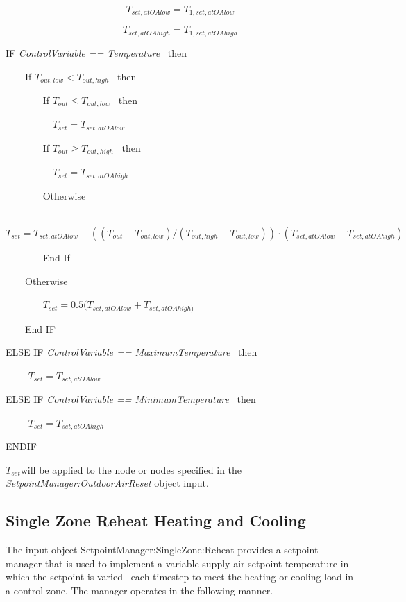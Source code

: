 \begin{equation}
{T_{set,atOAlow}} = {T_{1,set,atOAlow}}
\end{equation}

\begin{equation}
{T_{set,atOAhigh}} = {T_{1,set,atOAhigh}}
\end{equation}

IF \emph{ControlVariable == Temperature} ~then
 
~~~~If \({T_{out,low}} < {T_{out,high}}\) ~then

~~~~~~~ If \({T_{out}} \le {T_{out,low}}\) ~then

~~~~~~~~~ \({T_{set}} = {T_{set,atOAlow}}\)

~~~~~~~ If \({T_{out}} \ge {T_{out,high}}\) ~then

~~~~~~~~~ \({T_{set}} = {T_{set,atOAhigh}}\)

~~~~~~~ Otherwise

~~~~~~~~~ \({T_{set}} = {T_{set,atOAlow}} - (({T_{out}} - {T_{out,low}})/({T_{out,high}} - {T_{out,low}}))\cdot ({T_{set,atOAlow}} - {T_{set,atOAhigh}})\)

~~~~~~~ End If

~~~~Otherwise

~~~~~~~ \({T_{set}} = 0.5({T_{set,atOAlow}} + {T_{set,atOAhigh)}}\)

~~~~End IF

ELSE IF \emph{ControlVariable == MaximumTemperature} ~then

~~~~ \({T_{set}} = {T_{set,atOAlow}}\)

ELSE IF \emph{ControlVariable == MinimumTemperature} ~then

~~~~ \({T_{set}} = {T_{set,atOAhigh}}\)

ENDIF 

\emph{\({T_{set}}\)}will be applied to the node or nodes specified in the \emph{SetpointManager:OutdoorAirReset} object input.

\subsection{Single Zone Reheat Heating and Cooling}\label{single-zone-reheat-heating-and-cooling}

The input object SetpointManager:SingleZone:Reheat provides a setpoint manager that is used to implement a variable supply air setpoint temperature in which the setpoint is varied~ each timestep to meet the heating or cooling load in a control zone. The manager operates in the following manner.


